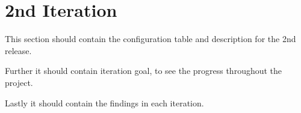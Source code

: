 \section{2nd Iteration}
This section should contain the configuration table and description for the 2nd release.

Further it should contain iteration goal, to see the progress throughout the project.

Lastly it should contain the findings in each iteration.